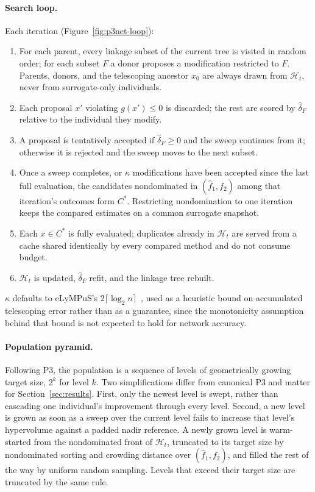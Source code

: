 \paragraph{Search loop.} Each iteration (Figure~\ref{fig:p3net-loop}):
\begin{enumerate}
    \item For each parent, every linkage subset of the current tree is visited in random order; for each subset
    $F$ a donor proposes a modification restricted to $F$. Parents, donors, and the telescoping ancestor $x_0$
    are always drawn from $\mathcal{H}_t$, never from surrogate-only individuals.
    \item Each proposal $x'$ violating $g(x') \leq 0$ is discarded; the rest are scored by $\hat\delta_F$
    relative to the individual they modify.
    \item A proposal is tentatively accepted if $\hat\delta_F \geq 0$ and the sweep continues from it;
    otherwise it is rejected and the sweep moves to the next subset.
    \item Once a sweep completes, or $\kappa$ modifications have been accepted since the last full evaluation,
    the candidates nondominated in $(\hat f_1, f_2)$ among that iteration's outcomes form $C^*$. Restricting
    nondomination to one iteration keeps the compared estimates on a common surrogate snapshot.
    \item Each $x \in C^*$ is fully evaluated; duplicates already in $\mathcal{H}_t$ are served from a cache
    shared identically by every compared method and do not consume budget.
    \item $\mathcal{H}_t$ is updated, $\hat\delta_F$ refit, and the linkage tree rebuilt.
\end{enumerate}
$\kappa$ defaults to eLyMPuS's $2\lceil\log_2 n\rceil$~\citep{przewozniczek2026lympus}, used as a heuristic
bound on accumulated telescoping error rather than as a guarantee, since the monotonicity assumption behind that
bound is not expected to hold for network accuracy.

\paragraph{Population pyramid.} Following P3, the population is a sequence of levels of geometrically growing
target size, $2^k$ for level $k$. Two simplifications differ from canonical P3 and matter for
Section~\ref{sec:results}. First, only the newest level is swept, rather than cascading one individual's
improvement through every level. Second, a new level is grown as soon as a sweep over the current level fails to
increase that level's hypervolume against a padded nadir reference. A newly grown level is warm-started from the
nondominated front of $\mathcal{H}_t$, truncated to its target size by nondominated sorting and crowding distance
over $(\hat f_1, f_2)$, and filled the rest of the way by uniform random sampling. Levels that exceed their target
size are truncated by the same rule.

